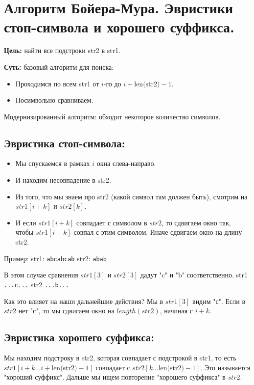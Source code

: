 \section{Алгоритм Бойера-Мура. Эвристики стоп-символа и хорошего суффикса.}

\textbf{Цель:} найти все подстроки \textsf{str2} в \textsf{str1}.

\textbf{Суть:} базовый алгоритм для поиска:
\begin{itemize}
	\item Проходимся по всем \textsf{str1} от $i$-го до $i+\text{len(str2)}-1$.
	\item Посимвольно сравниваем.
\end{itemize}
Модернизированный алгоритм: обходит некоторое количество символов.

\subsection*{Эвристика стоп-символа:}
\begin{itemize}
	\item Мы спускаемся в рамках $i$ окна слева-направо.
	\item И находим несовпадение в \textsf{str2}.
	\item Из того, что мы знаем про \textsf{str2} (какой символ там должен быть), смотрим на $str1[i+k]$ и $str2[k]$.
	\item И если $str1[i+k]$ совпадает с символом в $str2$, то сдвигаем окно так, чтобы $str1[i+k]$ совпал с этим символом. Иначе сдвигаем окно на длину \textsf{str2}.
\end{itemize}

Пример:
\textsf{str1}: \texttt{abcabcab}
\textsf{str2}: \texttt{abab}

В этом случае сравнения $str1[3]$ и $str2[3]$ дадут "c" и "b" соответственно.
\textsf{str1} \texttt{...c...}
\textsf{str2} \texttt{...b...}

Как это влияет на наши дальнейшие действия?
Мы в $str1[3]$ видим "с". Если в $str2$ нет "с", то мы сдвигаем окно на $length(str2)$, начиная с $i+k$.

\subsection*{Эвристика хорошего суффикса:}
Мы находим подстроку в \textsf{str2}, которая совпадает с подстрокой в \textsf{str1}, то есть $str1[i+k \dots i+\text{len(str2)}-1]$ совпадает с $str2[k \dots \text{len(str2)}-1]$.
Это называется "хороший суффикс".
Дальше мы ищем повторение "хорошего суффикса" в $str2$.

